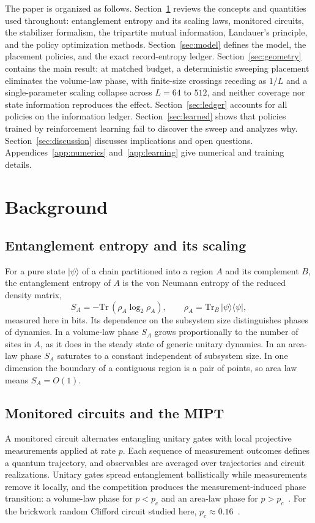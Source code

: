 \documentclass[aps,prb,twocolumn,superscriptaddress,nofootinbib]{revtex4-2}
\begin{document}
The paper is organized as follows. Section~\ref{sec:background} reviews
the concepts and quantities used throughout: entanglement entropy and its
scaling laws, monitored circuits, the stabilizer formalism, the
tripartite mutual information, Landauer's principle, and the policy
optimization methods. Section~\ref{sec:model} defines the model, the
placement policies, and the exact record-entropy ledger.
Section~\ref{sec:geometry} contains the main result: at matched budget, a
deterministic sweeping placement eliminates the volume-law phase, with
finite-size crossings receding as $1/L$ and a single-parameter scaling
collapse across $L = 64$ to $512$, and neither coverage nor state
information reproduces the effect. Section~\ref{sec:ledger} accounts for
all policies on the information ledger. Section~\ref{sec:learned} shows
that policies trained by reinforcement learning fail to discover the
sweep and analyzes why. Section~\ref{sec:discussion} discusses
implications and open questions. Appendices~\ref{app:numerics}
and~\ref{app:learning} give numerical and training details.

\section{Background}
\label{sec:background}

\subsection{Entanglement entropy and its scaling}
For a pure state $|\psi\rangle$ of a chain partitioned into a region $A$
and its complement $B$, the entanglement entropy of $A$ is the von
Neumann entropy of the reduced density matrix,
\begin{equation}
S_A = -\mathrm{Tr}\,(\rho_A \log_2 \rho_A),
\qquad
\rho_A = \mathrm{Tr}_B\, |\psi\rangle\langle\psi|,
\label{eq:vn}
\end{equation}
measured here in bits. Its dependence on the subsystem size
distinguishes phases of dynamics. In a volume-law phase $S_A$ grows
proportionally to the number of sites in $A$, as it does in the
steady state of generic unitary dynamics. In an area-law phase $S_A$
saturates to a constant independent of subsystem size. In one dimension
the boundary of a contiguous region is a pair of points, so area law
means $S_A = O(1)$.

\subsection{Monitored circuits and the MIPT}
A monitored circuit alternates entangling unitary gates with local
projective measurements applied at rate $p$. Each sequence of measurement
outcomes defines a quantum trajectory, and observables are averaged over
trajectories and circuit realizations. Unitary gates spread entanglement
ballistically while measurements remove it locally, and the competition
produces the measurement-induced phase transition: a volume-law phase for
$p < p_c$ and an area-law phase for
$p > p_c$~\cite{Li2018,Skinner2019,Chan2019}. For the brickwork random
Clifford circuit studied here, $p_c \approx 0.16$~\cite{Zabalo2020}.
\end{document}
